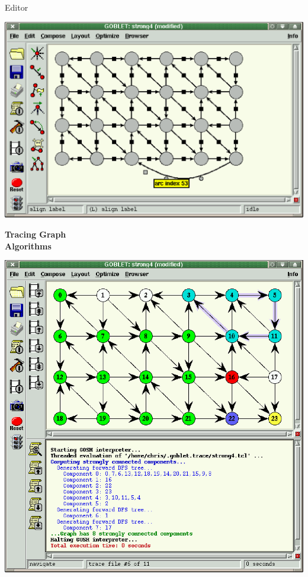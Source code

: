 \documentclass{report}
\begin{document}
\begin{landscape}
\begin{minipage}{6.5cm}
{\medskip Editor}
\vspace*{11cm}
\end{minipage}
\begin{minipage}{18cm}
\begin{center}
\vspace*{0.8cm}
\hspace*{3cm}
\includegraphics*[scale=0.65]{edit.ps}
\vspace*{2.8cm}
\end{center}
\end{minipage}


\clearpage
\begin{minipage}{6.5cm}
{\Huge\bf Tracing Graph \\ Algorithms}
\vspace*{11cm}
\end{minipage}
\begin{minipage}{18cm}
\begin{center}
\hspace*{3cm}
\includegraphics*[scale=0.65]{browse.ps}
\end{center}
\end{minipage}



\end{landscape}
\end{document}
